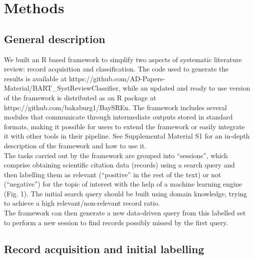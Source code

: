 \documentclass[]{bmcart}
\begin{document}
\section*{Methods}

\subsection*{General description}

We built an R \citep{rstats2021} based framework to simplify two aspects
of systematic literature review: record acquisition and classification.
The code used to generate the results is available at
https://github.com/AD-Papers-Material/BART\_SystReviewClassifier, while
an updated and ready to use version of the framework is distributed as
an R package at https://github.com/bakaburg1/BaySREn. The framework
includes several modules that communicate through intermediate outputs
stored in standard formats, making it possible for users to extend the
framework or easily integrate it with other tools in their pipeline. See
Supplemental Material S1 for an in-depth description of the framework
and how to use it.\\
The tasks carried out by the framework are grouped into ``sessions'',
which comprise obtaining scientific citation data (records) using a
search query and then labelling them as relevant (``positive'' in the
rest of the text) or not (``negative'') for the topic of interest with
the help of a machine learning engine (Fig. 1). The initial search query
should be built using domain knowledge, trying to achieve a high
relevant/non-relevant record ratio.\\
The framework can then generate a new data-driven query from this
labelled set to perform a new session to find records possibly missed by
the first query.\\

\subsection*{Record acquisition and initial labelling}
\end{document}

